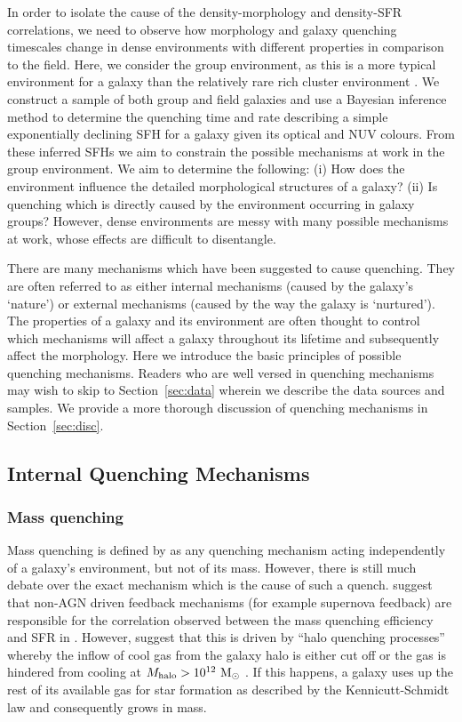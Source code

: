 \documentclass[useAMS,usenatbib]{mn2e}
\begin{document}
In order to isolate the cause of the density-morphology and density-SFR correlations, we need to observe how morphology and galaxy quenching timescales change in dense environments with different properties in comparison to the field. Here, we consider the group environment, as this is a more typical environment for a galaxy than the relatively rare rich cluster environment \citep{carlberg04}. We construct a sample of both group and field galaxies and use a Bayesian inference method to determine the quenching time and rate describing a simple exponentially declining SFH for a galaxy given its optical and NUV colours. From these inferred SFHs we aim to constrain the possible mechanisms at work in the group environment. We aim to determine the following: (i) How does the environment influence the detailed morphological structures of a galaxy?  (ii) Is quenching which is directly caused by the environment occurring in galaxy groups? However, dense environments are messy with many possible mechanisms at work, whose effects are difficult to disentangle. 

There are many mechanisms which have been suggested to cause quenching. They are often referred to as either internal mechanisms (caused by the galaxy's `nature') or external mechanisms (caused by the way the galaxy is `nurtured'). The properties of a galaxy and its environment are often thought to control which mechanisms will affect a galaxy throughout its lifetime and subsequently affect the morphology. Here we introduce the basic principles of possible quenching mechanisms. Readers who are well versed in quenching mechanisms may wish to skip to Section~\ref{sec:data} wherein we describe the data sources and samples. We provide a more thorough discussion of quenching mechanisms in Section~\ref{sec:disc}.

\subsection{Internal Quenching Mechanisms}\label{sec:intquench}

\subsubsection{Mass quenching}\label{sec:massquench}

Mass quenching is defined by \citet{peng10, peng12} as any quenching mechanism acting independently of a galaxy's environment, but not of its mass. However, there is still much debate over the exact mechanism which is the cause of such a quench. \citet{darvish16} suggest that non-AGN driven feedback mechanisms (for example supernova feedback) are responsible for the correlation observed between the mass quenching efficiency and SFR in \citet{peng10}. However, \citet{gabor15} suggest that this is driven by ``halo quenching processes'' whereby the inflow of cool gas from the galaxy halo is either cut off or the gas is hindered from cooling at $M_{\rm{halo}} > 10^{12}~\rm{M}_{\odot}$ \citep{birnboim03, dekel06}. If this happens, a galaxy uses up the rest of its available gas for star formation as described by the Kennicutt-Schmidt law \citep{schmidt59, kennicutt98} and consequently grows in mass.
\end{document}
